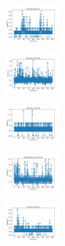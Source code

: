 \vspace*{\fill}
\newpage
\vspace*{\fill}

\begin{figure}[H]    
    \centering
    \begin{subfigure}
        \centering
        \includegraphics[width=0.234\textwidth]{img/aggun/iris_set_const_20_949004259_time.png}
    \end{subfigure}
    \hfill
    \begin{subfigure}
        \centering
        \includegraphics[width=0.234\textwidth]{img/aggun/ecoli_set_const_20_949004259_time.png}
    \end{subfigure}
    \hfill
    \begin{subfigure}
        \centering
        \includegraphics[width=0.234\textwidth]{img/aggun/rand_set_const_20_949004259_time.png}
    \end{subfigure}
    \hfill
    \begin{subfigure}
        \centering
        \includegraphics[width=0.234\textwidth]{img/aggun/newthyroid_set_const_20_949004259_time.png}
    \end{subfigure}
    \hfill
    \begin{subfigure}
        \centering
        \includegraphics[width=0.234\textwidth]{img/aggun/iris_set_const_20_589741062_time.png}

\end{subfigure}
\end{figure}
